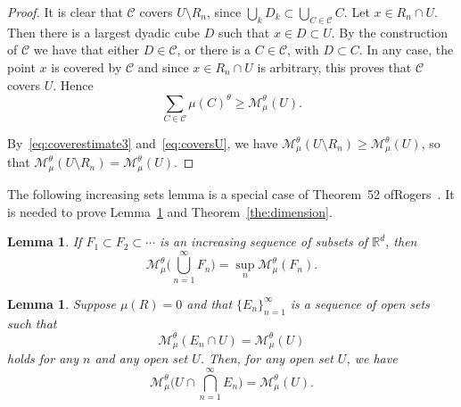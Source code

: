 \documentclass[11pt]{article}
\newtheorem{lemm}[theo]{Lemma}
\theoremstyle{definition}
\numberwithin{equation}{section}
\numberwithin{figure}{section}
\numberwithin{table}{section}
\begin{document}
\begin{proof}
It is clear that $\mathscr{C}$ covers $U \setminus R_n$, since $\bigcup_k D_k \subset \bigcup_{C \in \mathscr{C}} C$. Let $x \in R_n
\cap U$. Then there is a largest dyadic cube $D$ such that $x \in D
\subset U$. By the construction of $\mathscr{C}$ we have that either $D \in \mathscr{C}$, or there is a $C \in \mathscr{C}$, with $D
\subset C$. In any case, the point $x$ is covered by $\mathscr{C}$ and since $x \in R_n \cap U$ is arbitrary, this proves that $\mathscr{C}$ covers $U$. Hence
\begin{equation}\label{eq:coversU}
\sum_{C \in \mathscr{C}} \mu (C)^\theta \geq \mathscr{M}_\mu^\theta (U).
\end{equation}

By~\eqref{eq:coverestimate3} and~\eqref{eq:coversU}, we have $\mathscr{M}_\mu^\theta (U \setminus R_n) \geq
\mathscr{M}_\mu^\theta (U)$, so that $\mathscr{M}_\mu^\theta (U
\setminus R_n) = \mathscr{M}_\mu^\theta (U)$.
\end{proof}

The following increasing sets lemma is a special case of Theorem~52 of\linebreak Rogers~\cite{rogers}. It is needed to prove Lemma~\ref{lem:intersection} and Theorem~\ref{the:dimension}.

\begin{lemm}\label{lem:increasingsets}
If $F_1 \subset F_2 \subset \cdots$ is an increasing sequence of\/ subsets of\/ $\mathbb{R}^d$, then
\[
\mathscr{M}_\mu^\theta \biggl(\bigcup_{n=1}^\infty F_n \biggr) =
\sup_n \mathscr{M}_\mu^\theta (F_n).
\]
\end{lemm}

\begin{lemm}\label{lem:intersection}
Suppose $\mu (R) = 0$ and that $\{E_n\}_{n=1}^\infty$ is a sequence of open sets such that
\begin{equation}\label{eq:intersectionlemma}
\mathscr{M}_\mu^\theta (E_n \cap U) =
\mathscr{M}_\mu^\theta (U)
\end{equation}
holds for any $n$ and any open set $U$. Then, for any open set $U$, we have
\[
\mathscr{M}_\mu^\theta \biggl(U \cap \bigcap_{n=1}^\infty E_n
\biggr) = \mathscr{M}_\mu^\theta (U).
\]
\end{lemm}
\end{document}
